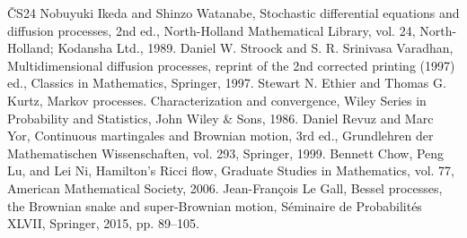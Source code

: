 \begin{thebibliography}{ČS24}
 Nobuyuki Ikeda and Shinzo Watanabe, Stochastic differential equations and diffusion processes, 2nd ed., North-Holland Mathematical Library, vol. 24, North-Holland; Kodansha Ltd., 1989.
 Daniel W. Stroock and S. R. Srinivasa Varadhan, Multidimensional diffusion processes, reprint of the 2nd corrected printing (1997) ed., Classics in Mathematics, Springer, 1997.
 Stewart N. Ethier and Thomas G. Kurtz, Markov processes. Characterization and convergence, Wiley Series in Probability and Statistics, John Wiley \& Sons, 1986.
 Daniel Revuz and Marc Yor, Continuous martingales and Brownian motion, 3rd ed., Grundlehren der Mathematischen Wissenschaften, vol. 293, Springer, 1999.
 Bennett Chow, Peng Lu, and Lei Ni, Hamilton’s Ricci flow, Graduate Studies in Mathematics, vol. 77, American Mathematical Society, 2006.
 Jean-François Le Gall, Bessel processes, the Brownian snake and super-Brownian motion, Séminaire de Probabilités XLVII, Springer, 2015, pp. 89–105.
\end{thebibliography}
